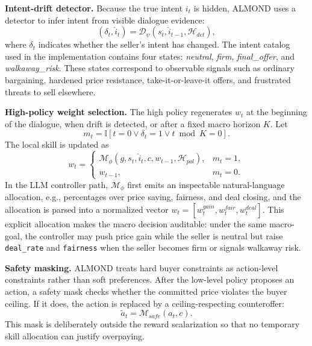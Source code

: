 \documentclass[conference]{IEEEtran}
\begin{document}
\textbf{Intent-drift detector.}
Because the true intent $i_t$ is hidden, ALMOND uses a detector to infer intent
from visible dialogue evidence:
\begin{equation}
    (\delta_t,\hat{i}_t)=
    \mathcal{D}_{\psi}(s_t,\hat{i}_{t-1},\mathcal{H}_{det}),
\end{equation}
where $\delta_t$ indicates whether the seller's intent has changed. The intent
catalog used in the implementation contains four states:
\textit{neutral}, \textit{firm}, \textit{final\_offer}, and
\textit{walkaway\_risk}. These states correspond to observable signals such as
ordinary bargaining, hardened price resistance, take-it-or-leave-it offers, and
frustrated threats to sell elsewhere.

\textbf{High-policy weight selection.}
The high policy regenerates $w_t$ at the beginning of the dialogue, when drift
is detected, or after a fixed macro horizon $K$. Let
\begin{equation}
    m_t=\mathbb{I}[t=0 \vee \delta_t=1 \vee t \bmod K=0].
\end{equation}
The local skill is updated as
\begin{equation}
    w_t =
    \begin{cases}
    \mathcal{M}_{\phi}(g,s_t,\hat{i}_t,c,w_{t-1},\mathcal{H}_{pol}),
    & m_t=1,\\
    w_{t-1}, & m_t=0.
    \end{cases}
\end{equation}
In the LLM controller path, $\mathcal{M}_{\phi}$ first emits an inspectable
natural-language allocation, e.g., percentages over price saving, fairness, and
deal closing, and the allocation is parsed into a normalized vector
$w_t=[w^{gain}_t,w^{fair}_t,w^{deal}_t]$. This explicit allocation makes the
macro decision auditable: under the same macro-goal, the controller may push
price gain while the seller is neutral but raise \texttt{deal\_rate} and
\texttt{fairness} when the seller becomes firm or signals walkaway risk.

\textbf{Safety masking.}
ALMOND treats hard buyer constraints as action-level constraints rather than
soft preferences. After the low-level policy proposes an action, a safety mask
checks whether the committed price violates the buyer ceiling. If it does, the
action is replaced by a ceiling-respecting counteroffer:
\begin{equation}
    \tilde{a}_t = \mathcal{M}_{safe}(a_t,c).
\end{equation}
This mask is deliberately outside the reward scalarization so that no temporary
skill allocation can justify overpaying.
\end{document}
